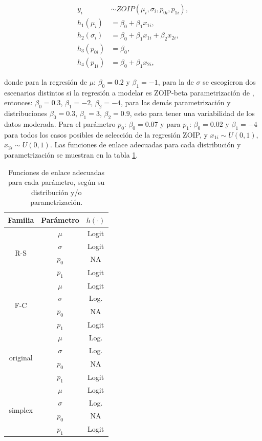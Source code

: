 \begin{equation}
\begin{split}
y_{i} & \sim ZOIP(\mu_{i},\sigma_{i},p_{0i}, p_{1i}),\\
h_1(\mu_{i}) &=\beta_0+\beta_1x_{1i},\\
h_2(\sigma_{i}) &=\beta_0+\beta_1x_{1i}+\beta_2x_{2i},\\
h_3(p_{0i}) &=\beta_0,\\
h_4(p_{1i}) &=\beta_0+\beta_1x_{2i},
\end{split}
\label{S_eq_reg}
\end{equation}

donde para la regresi\'{o}n de $\mu$: $\beta_0=0.2$ y $\beta_1=-1$, para la de $\sigma$ se escogieron dos escenarios distintos si la regresi\'{o}n a modelar es ZOIP-beta parametrizaci\'{o}n de \cite{Stasinopoulos2}, entonces: $\beta_0=0.3$, $\beta_1=-2$, $\beta_2=-4$, para las dem\'{a}s parametrizaci\'{o}n y distribuciones $\beta_0=0.3$, $\beta_1=3$, $\beta_2=0.9$, esto para tener una variabilidad de los datos moderada. Para el par\'{a}metro $p_0$: $\beta_0=0.07$ y para $p_1$: $\beta_0=0.02$ y $\beta_1=-4$ para todos los casos posibles de selecci\'{o}n de la regresi\'{o}n ZOIP, y $x_{1i} \sim U(0,1)$, $x_{2i} \sim U(0,1)$. Las funciones de enlace adecuadas para cada distribuci\'{o}n y parametrizaci\'{o}n se muestran en la tabla \ref{T_F_enlace}.\\

\begin{table}[!hbt]
{\scriptsize
\begin{center}
\begin{tabular}{|c|c|c|}\hline
Familia & Par\'{a}metro & $h(\cdot)$ \\ \hline
\multirow{4}{*}{R-S} & $\mu$ & Logit \\
 & $\sigma$ & Logit \\
 & $p_0$ & NA \\
 & $p_1$ & Logit \\ \hline

\multirow{4}{*}{F-C} & $\mu$ & Logit \\
 & $\sigma$ & Log. \\
 & $p_0$ & NA \\
 & $p_1$ & Logit \\ \hline

\multirow{4}{*}{original} & $\mu$ & Log. \\
 & $\sigma$ & Log. \\
 & $p_0$ & NA \\
 & $p_1$ & Logit \\ \hline

\multirow{4}{*}{simplex} & $\mu$ & Logit \\
 & $\sigma$ & Log. \\
 & $p_0$ & NA \\
 & $p_1$ & Logit \\ \hline

\end{tabular}
\caption{Funciones de enlace adecuadas para cada par\'{a}metro, seg\'{u}n su distribuci\'{o}n y/o parametrizaci\'{o}n.}
\label{T_F_enlace}
\end{center}
}
\end{table}

